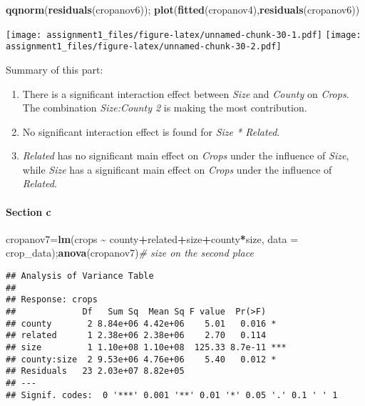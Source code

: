 \documentclass[
]{article}
\newenvironment{Shaded}{\begin{snugshade}}{\end{snugshade}}
\newcommand{\AttributeTok}[1]{\textcolor[rgb]{0.13,0.29,0.53}{#1}}
\newcommand{\CommentTok}[1]{\textcolor[rgb]{0.56,0.35,0.01}{\textit{#1}}}
\newcommand{\FunctionTok}[1]{\textcolor[rgb]{0.13,0.29,0.53}{\textbf{#1}}}
\newcommand{\NormalTok}[1]{#1}
\newcommand{\OtherTok}[1]{\textcolor[rgb]{0.56,0.35,0.01}{#1}}
\newcommand{\SpecialCharTok}[1]{\textcolor[rgb]{0.81,0.36,0.00}{\textbf{#1}}}
\begin{document}
\begin{Shaded}
\begin{Highlighting}[]
\FunctionTok{qqnorm}\NormalTok{(}\FunctionTok{residuals}\NormalTok{(cropanov6)); }\FunctionTok{plot}\NormalTok{(}\FunctionTok{fitted}\NormalTok{(cropanov4),}\FunctionTok{residuals}\NormalTok{(cropanov6))}
\end{Highlighting}
\end{Shaded}

\texttt{[image: assignment1\_files/figure-latex/unnamed-chunk-30-1.pdf]}
\texttt{[image: assignment1\_files/figure-latex/unnamed-chunk-30-2.pdf]}

Summary of this part:

\begin{enumerate}
\def\labelenumi{(\arabic{enumi})}
\item
  There is a significant interaction effect between \emph{Size} and
  \emph{County} on \emph{Crops}. The combination \emph{Size:County 2} is
  making the most contribution.
\item
  No significant interaction effect is found for \emph{Size * Related}.
\item
  \emph{Related} has no significant main effect on \emph{Crops} under
  the influence of \emph{Size}, while \emph{Size} has a significant main
  effect on \emph{Crops} under the influence of \emph{Related}.
\end{enumerate}

\paragraph{Section c}\label{section-c}

\begin{Shaded}
\begin{Highlighting}[]
\NormalTok{cropanov7}\OtherTok{=}\FunctionTok{lm}\NormalTok{(crops }\SpecialCharTok{\textasciitilde{}}\NormalTok{ county}\SpecialCharTok{+}\NormalTok{related}\SpecialCharTok{+}\NormalTok{size}\SpecialCharTok{+}\NormalTok{county}\SpecialCharTok{*}\NormalTok{size, }\AttributeTok{data =}\NormalTok{ crop\_data);}\FunctionTok{anova}\NormalTok{(cropanov7)}\CommentTok{\# size on the second place}
\end{Highlighting}
\end{Shaded}

\begin{verbatim}
## Analysis of Variance Table
## 
## Response: crops
##             Df   Sum Sq  Mean Sq F value  Pr(>F)    
## county       2 8.84e+06 4.42e+06    5.01   0.016 *  
## related      1 2.38e+06 2.38e+06    2.70   0.114    
## size         1 1.10e+08 1.10e+08  125.33 8.7e-11 ***
## county:size  2 9.53e+06 4.76e+06    5.40   0.012 *  
## Residuals   23 2.03e+07 8.82e+05                    
## ---
## Signif. codes:  0 '***' 0.001 '**' 0.01 '*' 0.05 '.' 0.1 ' ' 1
\end{verbatim}
\end{document}
